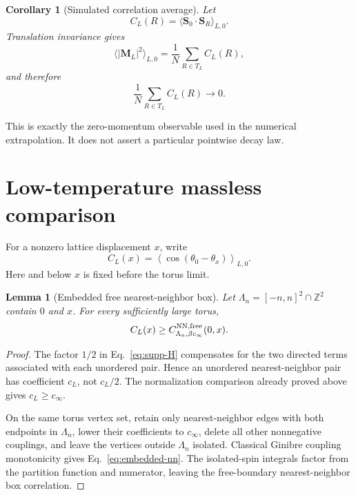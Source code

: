 \documentclass[aps,prb,preprint,notitlepage,groupedaddress,amsmath,amssymb,
               superscriptaddress,nofootinbib,floatfix]{revtex4-2}
\theoremstyle{definition}
\theoremstyle{plain}
\newtheorem{lemma}{Lemma}
\newtheorem{corollary}{Corollary}
\begin{document}
\begin{corollary}[Simulated correlation average]
Let
\begin{equation}
 C_L(R)=\langle\bm S_0\cdot\bm S_R\rangle_{L,0}.
\end{equation}
Translation invariance gives
\begin{equation}
 \langle|\bm M_L|^2\rangle_{L,0}
 =\frac1N\sum_{R\in T_L}C_L(R),
\end{equation}
and therefore
\begin{equation}
 \frac1N\sum_{R\in T_L}C_L(R)\longrightarrow0.
\end{equation}
\end{corollary}

This is exactly the zero-momentum observable used in the numerical
extrapolation.  It does not assert a particular pointwise decay law.

\section{Low-temperature massless comparison}

For a nonzero lattice displacement $x$, write
\begin{equation}
 C_L(x)=
 \left\langle\cos(\theta_0-\theta_x)\right\rangle_{L,0}.
\end{equation}
Here and below $x$ is fixed before the torus limit.

\begin{lemma}[Embedded free nearest-neighbor box]
\label{lem:embedded-nn}
Let $\Lambda_n=[-n,n]^2\cap\mathbb Z^2$ contain $0$ and $x$.
For every sufficiently large torus,
\begin{equation}
 C_L(x)\ge
 C_{\Lambda_n,\beta c_\infty}^{\rm NN,free}(0,x).
\label{eq:embedded-nn}
\end{equation}
\end{lemma}

\begin{proof}
The factor $1/2$ in Eq.~\eqref{eq:supp-H} compensates for the two directed
terms associated with each unordered pair.  Hence an unordered
nearest-neighbor pair has coefficient $c_L$, not $c_L/2$.  The
normalization comparison already proved above gives
$c_L\ge c_\infty$.

On the same torus vertex set, retain only nearest-neighbor edges with both
endpoints in $\Lambda_n$, lower their coefficients to $c_\infty$, delete
all other nonnegative couplings, and leave the vertices outside
$\Lambda_n$ isolated.  Classical Ginibre coupling monotonicity
\cite{Ginibre1970,VanEngelenburgLis2023} gives
Eq.~\eqref{eq:embedded-nn}.  The isolated-spin integrals factor from the
partition function and numerator, leaving the free-boundary
nearest-neighbor box correlation.
\end{proof}
\end{document}
